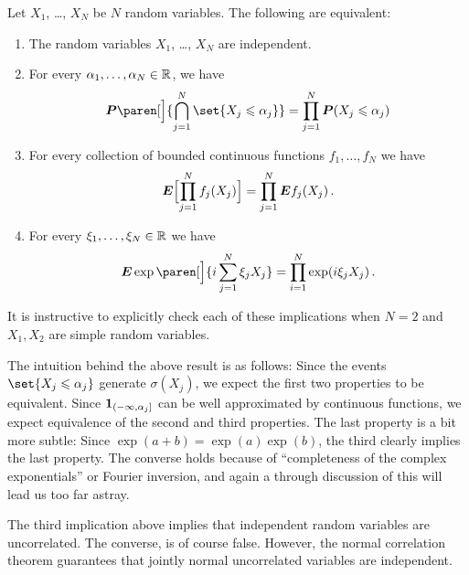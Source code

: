\begin{proposition}
  Let $X_1$, \dots, $X_N$ be $N$ random variables.
  The following are equivalent:
  \begin{enumerate}
    \item The random variables $X_1$, \dots, $X_N$ are independent.
    \item For every $\alpha_1, \dots, \alpha_N \in \R$, we have
      \begin{equation*}
	\P\paren[\Big]{
	  \bigcap_{j=1}^N \set{X_j \leq \alpha_j}
	}
	= \prod_{j=1}^N \P(X_j \leq \alpha_j)
      \end{equation*}
    \item For every collection of bounded continuous functions $f_1, \dots, f_N$ we have
      \begin{equation*}
	\E \brak[\Big]{ \prod_{j = 1}^N f_j(X_j) } = \prod_{j=1}^N \E f_j(X_j) \,.
      \end{equation*}

    \item
      For every $\xi_1, \dots, \xi_N \in \R$ we have
      \begin{equation*}
	\E \exp\paren[\Big]{ i\sum_{j=1}^{N} \xi_j X_j }
	= \prod_{i=1}^{N} \exp( i \xi_j X_j )\,.
      \end{equation*}
  \end{enumerate}
\end{proposition}

\begin{remark}
  It is instructive to explicitly check each of these implications when $N = 2$ and $X_1, X_2$ are simple random variables.
\end{remark}

\begin{remark}
  The intuition behind the above result is as follows:
  Since the events $\set{X_j \leq \alpha_j}$ generate $\sigma(X_j)$, we expect the first two properties to be equivalent.
  Since $\one_{(-\infty, \alpha_j]}$ can be well approximated by continuous functions, we expect equivalence of the second and third properties.
  The last property is a bit more subtle: Since $\exp(a + b) = \exp(a) \exp(b)$, the third clearly implies the last property.
  The converse holds because of ``completeness of the complex exponentials'' or Fourier inversion, and again a through discussion of this will lead us too far astray.
\end{remark}

\begin{remark}
  The third implication above implies that independent random variables are uncorrelated. The converse, is of course false.
  However, the normal correlation theorem guarantees that jointly normal uncorrelated variables are independent.
\end{remark}


